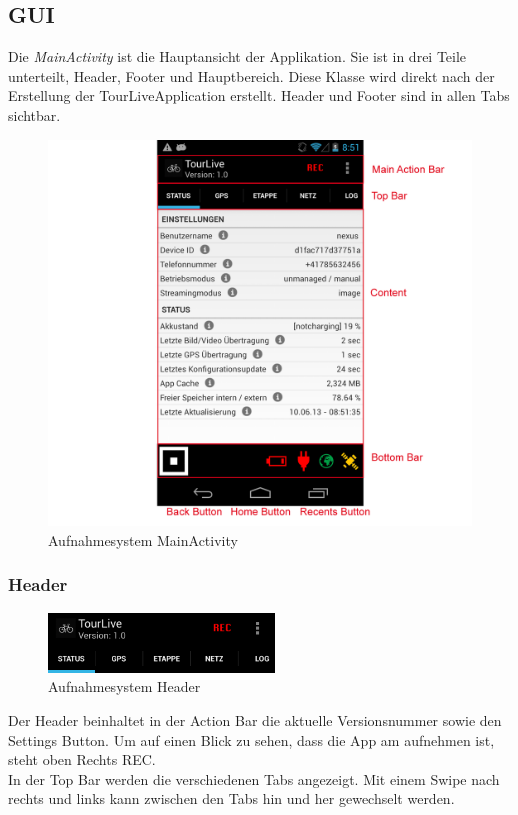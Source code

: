\subsection{GUI}
Die \textit{MainActivity} ist die Hauptansicht der Applikation. Sie ist in drei Teile unterteilt, Header, Footer und Hauptbereich. Diese Klasse wird direkt nach der Erstellung der TourLiveApplication erstellt. Header und Footer sind in allen Tabs sichtbar.

\begin{figure}[H]
	\centering
	\includegraphics[width=120mm]{images/android/status.png}
	\caption{Aufnahmesystem MainActivity}
\end{figure}


\subsubsection{Header}
\begin{figure}[H]
	\centering
	\includegraphics[width=60mm]{images/android/header.png}
	\caption{Aufnahmesystem Header}
\end{figure}
Der Header beinhaltet in der Action Bar die aktuelle Versionsnummer sowie den Settings Button. Um auf einen Blick zu sehen, dass die App am aufnehmen ist, steht oben Rechts REC. \\
In der Top Bar werden die verschiedenen Tabs angezeigt. Mit einem Swipe nach rechts und links kann zwischen den Tabs hin und her gewechselt werden.

